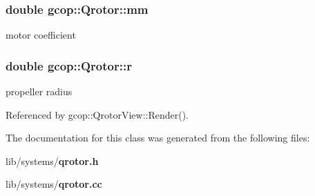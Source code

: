 \subsubsection[{mm}]{\setlength{\rightskip}{0pt plus 5cm}double {\bf gcop\-::\-Qrotor\-::mm}}\label{classgcop_1_1Qrotor_a661587e61cc7c22739e4f72ca9671ab1}


motor coefficient 

\subsubsection[{r}]{\setlength{\rightskip}{0pt plus 5cm}double {\bf gcop\-::\-Qrotor\-::r}}\label{classgcop_1_1Qrotor_a8a73357c400a81f3fb0a377d4a3d7d32}


propeller radius 



\-Referenced by gcop\-::\-Qrotor\-View\-::\-Render().



\-The documentation for this class was generated from the following files\-:\begin{DoxyCompactItemize}
\item 
lib/systems/{\bf qrotor.\-h}\item 
lib/systems/{\bf qrotor.\-cc}\end{DoxyCompactItemize}
